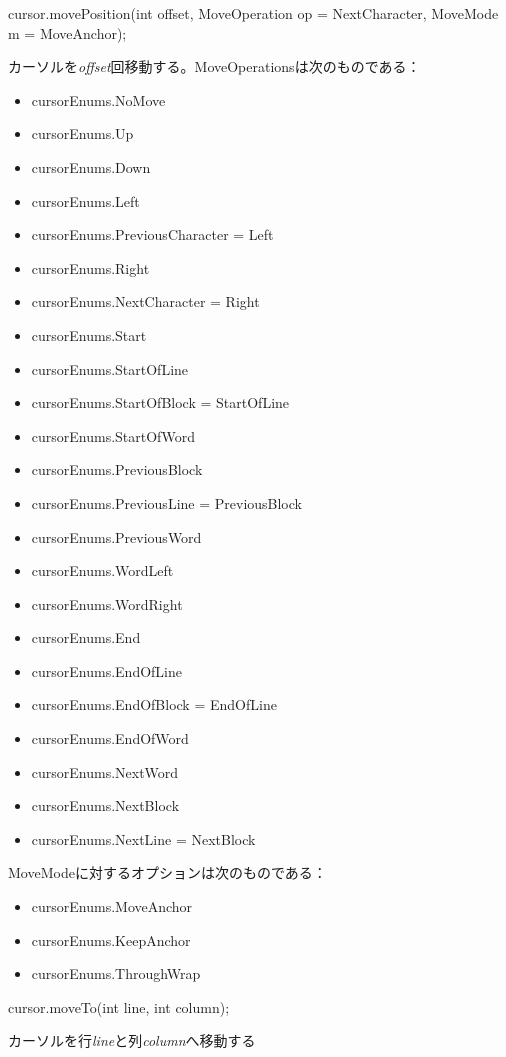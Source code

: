 \documentclass[]{book}
\begin{document}
cursor.movePosition(int offset, MoveOperation op = NextCharacter,
MoveMode m = MoveAnchor);

カーソルを\emph{offset}回移動する。MoveOperationsは次のものである：

\begin{itemize}
\item
  cursorEnums.NoMove
\item
  cursorEnums.Up
\item
  cursorEnums.Down
\item
  cursorEnums.Left
\item
  cursorEnums.PreviousCharacter = Left
\item
  cursorEnums.Right
\item
  cursorEnums.NextCharacter = Right
\item
  cursorEnums.Start
\item
  cursorEnums.StartOfLine
\item
  cursorEnums.StartOfBlock = StartOfLine
\item
  cursorEnums.StartOfWord
\item
  cursorEnums.PreviousBlock
\item
  cursorEnums.PreviousLine = PreviousBlock
\item
  cursorEnums.PreviousWord
\item
  cursorEnums.WordLeft
\item
  cursorEnums.WordRight
\item
  cursorEnums.End
\item
  cursorEnums.EndOfLine
\item
  cursorEnums.EndOfBlock = EndOfLine
\item
  cursorEnums.EndOfWord
\item
  cursorEnums.NextWord
\item
  cursorEnums.NextBlock
\item
  cursorEnums.NextLine = NextBlock
\end{itemize}

MoveModeに対するオプションは次のものである：

\begin{itemize}
\item
  cursorEnums.MoveAnchor
\item
  cursorEnums.KeepAnchor
\item
  cursorEnums.ThroughWrap
\end{itemize}

cursor.moveTo(int line, int column);

カーソルを行\emph{line}と列\emph{column}へ移動する
\end{document}
